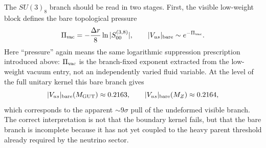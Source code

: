 \documentclass[11pt]{article}
\begin{document}
The $SU(3)_8$ branch should be read in two stages. First, the visible low-weight block defines the bare topological pressure
\begin{equation}
 \Pi_{\rm vac} = -\frac{\Delta r}{8}\ln|S_{00}^{(3,8)}|,
 \qquad
 |V_{us}|_{\rm bare}\sim e^{-\Pi_{\rm vac}}.
\end{equation}
Here ``pressure'' again means the same logarithmic suppression prescription
introduced above: $\Pi_{\rm vac}$ is the branch-fixed exponent extracted from
the low-weight vacuum entry, not an independently varied fluid variable.
At the level of the full unitary kernel this bare branch gives
\begin{equation}
 |V_{us}|_{\rm bare}(M_{\rm GUT})\approx0.2163,
 \qquad
 |V_{us}|_{\rm bare}(M_Z)\approx0.2164,
\end{equation}
which corresponds to the apparent $\sim9\sigma$ pull of the undeformed visible branch. The correct interpretation is not that the boundary kernel fails, but that the bare branch is incomplete because it has not yet coupled to the heavy parent threshold already required by the neutrino sector.
\end{document}
